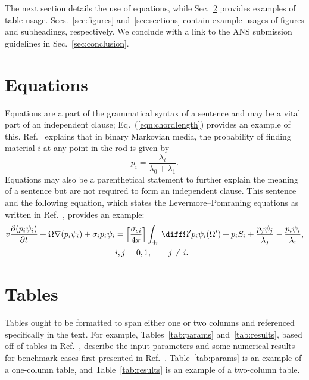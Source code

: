 \documentclass{style/nseJournal}
\begin{document}
The next section details the use of equations, while Sec.~\ref{sec:tables} provides examples of table usage.
Secs.~\ref{sec:figures} and~\ref{sec:sections} contain example usages of figures and subheadings, respectively.
We conclude with a link to the ANS submission guidelines in Sec.~\ref{sec:conclusion}.



\section{Equations}
\label{sec:equations}

Equations are a part of the grammatical syntax of a sentence and may be a vital part of an independent clause; Eq.~(\ref{eqn:chordlength}) provides an example of this.
Ref.~\cite{AdamsJQSRT1989} explains that in binary Markovian media, the probability of finding material \(i\) at any point in the rod is given by
\begin{equation}
  p_i = \frac{\lambda_i}{\lambda_0 + \lambda_1}.
  \label{eqn:chordlength}
\end{equation}
Equations may also be a parenthetical statement to further explain the meaning of a sentence but are not required to form an independent clause.
This sentence and the following equation, which states the Levermore--Pomraning equations as written in Ref.~\cite{AdamsJQSRT1989}, provides an example:
\begin{align}
\begin{split}
  v \frac{\partial(p_i \psi_i)}{\partial t} + \Omega \nabla(p_i \psi_i) + \sigma_i p_i \psi_i &= \left[ \frac{\sigma_{si}}{4\pi} \right] \int_{4\pi} \diff \Omega' p_i \psi_i(\Omega') + p_i S_i + \frac{p_j \psi_j}{\lambda_j} - \frac{p_i \psi_i}{\lambda_i}, \\ 
  & i, j = 0,1, \qquad j \neq i.
\end{split}
  \label{eqn:LPequations}
\end{align}



\section{Tables}
\label{sec:tables}

Tables ought to be formatted to span either one or two columns and referenced specifically in the text.
For example, Tables~\ref{tab:params} and~\ref{tab:results}, based off of tables in Ref.~\cite{BrantleyMC2009Incident}, describe the input parameters and some numerical results for benchmark cases first presented in Ref.~\cite{AdamsJQSRT1989}.
Table~\ref{tab:params} is an example of a one-column table, and Table~\ref{tab:results} is an example of a two-column table.
\end{document}
